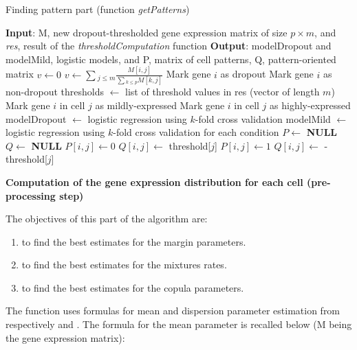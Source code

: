 \documentclass{report}
\begin{document}
{\begin{algorithm}[H]
\caption{Finding pattern part (function \emph{getPatterns})}
\begin{algorithmic}
\STATE \textbf{Input}: M, new dropout-thresholded gene expression matrix of size $p \times m$, and \textit{res}, result of the \textit{thresholdComputation} function
\STATE \textbf{Output}: modelDropout and modelMild, logistic models, and P, matrix of cell patterns, Q, pattern-oriented matrix
\STATE $v \leftarrow 0$
\ELSE
\STATE $v \leftarrow \sum{_{j \leq m} \frac{M[i,j]}{\sum{_{k \leq p} M[k, j]}}}$
\ENDIF
{}
\STATE Mark gene $i$ as dropout
\ELSE
\STATE Mark gene $i$ as non-dropout
\ENDIF
\ENDFOR
\STATE thresholds $\leftarrow$ list of threshold values in res (vector of length $m$)
\STATE Mark gene $i$ in cell $j$ as mildly-expressed
\ELSE
\STATE Mark gene $i$ in cell $j$ as highly-expressed
\ENDIF
\ENDFOR
\ENDFOR
\STATE modelDropout $\leftarrow$ logistic regression using $k$-fold cross validation 
\STATE modelMild $\leftarrow$ logistic regression using $k$-fold cross validation for each condition
\STATE $P \leftarrow$ \textbf{NULL}
\STATE $Q \leftarrow$ \textbf{NULL}
\STATE $P[i,j] \leftarrow 0$
\STATE $Q[i,j] \leftarrow$ threshold[$j$]
\ELSE
\STATE $P[i,j] \leftarrow 1$
\STATE $Q[i,j] \leftarrow$ -threshold[$j$]
\ENDIF
\ENDFOR
\ENDFOR
{}
\end{algorithmic}
\end{algorithm}

\bigskip
\noindent \textbf{Computation of the gene expression distribution for each cell (pre-processing step)}
\bigskip

The objectives of this part of the algorithm are:
\begin{enumerate}
\item to find the best estimates for the margin parameters.
\item to find the best estimates for the mixtures rates.
\item to find the best estimates for the copula parameters.
\end{enumerate}

The  function uses formulas for mean and dispersion parameter estimation from respectively \cite{anders2010differential} and \cite{yu2013shrinkage}. The formula for the mean parameter is recalled below (M being the gene expression matrix):

}
\end{document}
